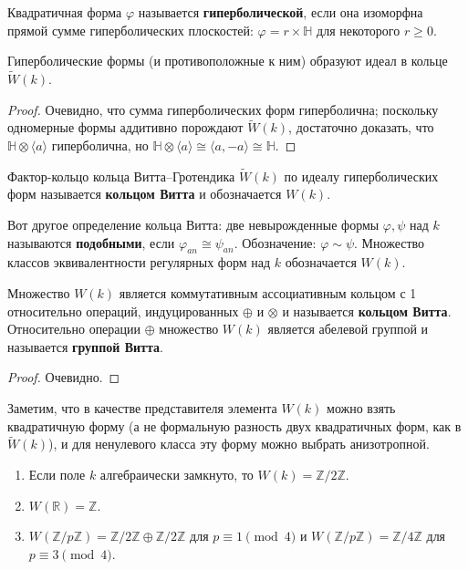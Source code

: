 \documentclass[a4paper,oneside,12pt]{article}
\theoremstyle{plain} { \swapnumbers
\newtheorem{theorem}{Теорема}[subsection]
\newtheorem{corollary}[theorem]{Следствие}
\newtheorem{lemma}[theorem]{Лемма}
\newtheorem{proposition}[theorem]{Утверждение}
\newtheorem{claim}[theorem]{Факт}
}
\theoremstyle{definition} { \swapnumbers
\newtheorem{definition}[theorem]{Определение}
\newtheorem{notation}[theorem]{Обозначение}
\newtheorem{remark}[theorem]{Замечание}
\newtheorem{remarks}[theorem]{Замечания}
\newtheorem{example}[theorem]{Пример}
\newtheorem{examples}[theorem]{Примеры}
\newtheorem{sssection}[theorem]{}
}
\def\tilde{\widetilde}
\def\ph{\varphi}
\def\la{\langle}
\def\ra{\rangle}
\begin{document}
\begin{definition}
Квадратичная форма $\ph$ называется {\bf гиперболической}, если она изоморфна
прямой сумме гиперболических плоскостей: $\ph=r\times\mathbb H$ для некоторого $r\geq 0$.
\end{definition}
\begin{proposition}
Гиперболические формы (и противоположные к ним) образуют идеал в кольце $\tilde W(k)$.
\end{proposition}
\begin{proof}
Очевидно, что сумма гиперболических форм гиперболична; поскольку одномерные формы аддитивно
порождают $\tilde W(k)$, достаточно доказать, что $\mathbb H\otimes\la a\ra$ гиперболична,
но $\mathbb H\otimes\la a\ra\cong\la a,-a\ra\cong\mathbb H$.
\end{proof}
\begin{definition}
Фактор-кольцо кольца Витта--Гротендика $\tilde W(k)$ по идеалу гиперболических форм
называется {\bf кольцом Витта} и обозначается $W(k)$.
\end{definition}

Вот другое определение кольца Витта: две невырожденные
формы $\ph,\psi$ над $k$ называются {\bf подобными}, если $\ph_{an}\cong\psi_{an}$.
Обозначение: $\ph\sim\psi$. Множество классов эквивалентности регулярных форм над $k$
обозначается $W(k)$.
\begin{theorem}[Витт, 1937]
Множество $W(k)$ является коммутативным ассоциативным кольцом с 1
относительно операций, индуцированных $\oplus$ и $\otimes$ и называется {\bf кольцом Витта}.
Относительно операции $\oplus$ множество $W(k)$ является абелевой группой и называется {\bf группой Витта}.
\end{theorem}
\begin{proof}
Очевидно.
\end{proof}

Заметим, что в качестве представителя элемента $W(k)$ можно взять квадратичную форму (а не формальную разность
двух квадратичных форм, как в $\tilde W(k)$), и для ненулевого класса эту форму можно выбрать анизотропной.

\begin{examples}
\begin{enumerate}
\item Если поле $k$ алгебраически замкнуто, то $W(k)=\mathbb Z/2\mathbb Z$.
\item $W(\mathbb R)=\mathbb Z$.
\item $W(\mathbb Z/p\mathbb Z)=\mathbb Z/2\mathbb Z\oplus\mathbb Z/2\mathbb Z$ для $p\equiv 1\pmod 4$ и
$W(\mathbb Z/p\mathbb Z)=\mathbb Z/4\mathbb Z$ для $p\equiv 3\pmod 4$.
\end{enumerate}
\end{examples}
\end{document}
